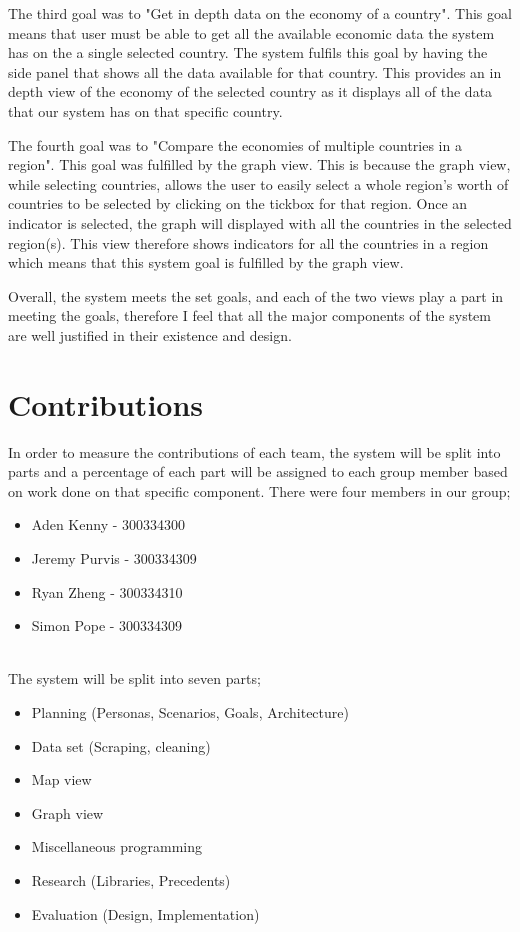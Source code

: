 \documentclass[10pt, journal]{IEEEtran}
\begin{document}
The third goal was to "Get in depth data on the economy of a country". This goal means that user must be able to get all the available economic data the system has on the a single selected country. The system fulfils this goal by having the side panel that shows all the data available for that country. This provides an in depth view of the economy of the selected country as it displays all of the data that our system has on that specific country. 

The fourth goal was to "Compare the economies of multiple countries in a region". This goal was fulfilled by the graph view. This is because the graph view, while selecting countries, allows the user to easily select a whole region's worth of countries to be selected by clicking on the tickbox for that region. Once an indicator is selected, the graph will displayed with all the countries in the selected region(s). This view therefore shows indicators for all the countries in a region which means that this system goal is 
fulfilled by the graph view.

Overall, the system meets the set goals, and each of the two views play a part in meeting the goals, therefore I feel that all the major components of the system are well justified in their existence and design.

\section{Contributions}

In order to measure the contributions of each team, the system will be split into parts and a percentage of each part will be assigned to each group member based on work done on that specific component. There were four members in our group;

\begin{itemize}

\item{Aden Kenny - 300334300}
\item{Jeremy Purvis - 300334309}
\item{Ryan Zheng - 300334310}
\item{Simon Pope - 300334309}

\end{itemize}

~\\
The system will be split into seven parts;
\begin{itemize}
\item{Planning (Personas, Scenarios, Goals, Architecture)}
\item{Data set (Scraping, cleaning)}
\item{Map view}
\item{Graph view}
\item{Miscellaneous programming}
\item{Research (Libraries, Precedents)}
\item{Evaluation (Design, Implementation)}
\end{itemize}
\end{document}
